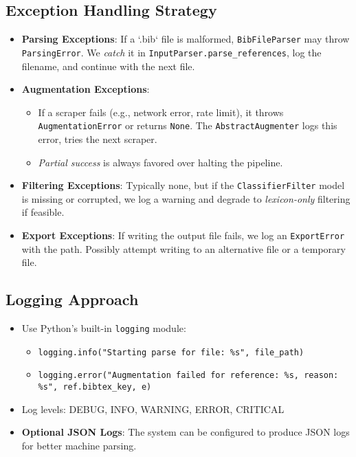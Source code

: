 \documentclass[12pt]{article}
\begin{document}
\subsection{Exception Handling Strategy}
\begin{itemize}
  \item \textbf{Parsing Exceptions}: If a `.bib` file is malformed, \texttt{BibFileParser} may throw \texttt{ParsingError}. We \emph{catch} it in \texttt{InputParser.parse\_references}, log the filename, and continue with the next file.
  \item \textbf{Augmentation Exceptions}: 
    \begin{itemize}
      \item If a scraper fails (e.g., network error, rate limit), it throws \texttt{AugmentationError} or returns \texttt{None}. The \texttt{AbstractAugmenter} logs this error, tries the next scraper.
      \item \emph{Partial success} is always favored over halting the pipeline.
    \end{itemize}
  \item \textbf{Filtering Exceptions}: Typically none, but if the \texttt{ClassifierFilter} model is missing or corrupted, we log a warning and degrade to \emph{lexicon-only} filtering if feasible.
  \item \textbf{Export Exceptions}: If writing the output file fails, we log an \texttt{ExportError} with the path. Possibly attempt writing to an alternative file or a temporary file.
\end{itemize}

\subsection{Logging Approach}
\begin{itemize}
  \item Use Python’s built-in \texttt{logging} module:
    \begin{itemize}
      \item \texttt{logging.info("Starting parse for file: \%s", file\_path)}
      \item \texttt{logging.error("Augmentation failed for reference: \%s, reason: \%s", ref.bibtex\_key, e)}
    \end{itemize}
  \item Log levels: DEBUG, INFO, WARNING, ERROR, CRITICAL
  \item \textbf{Optional JSON Logs}: The system can be configured to produce JSON logs for better machine parsing.
\end{itemize}
\end{document}
